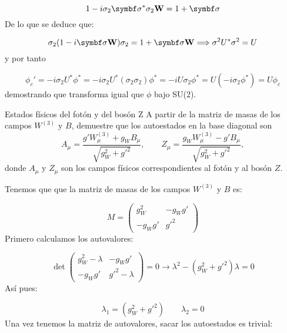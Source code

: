 \begin{equation}
	1 - i  \sigma_2 \sigman^* \sigma_2 \Wn = 1 + \sigman
\end{equation}
De lo que se deduce que:

\begin{equation}
	\sigma_2 (1- i \sigman \Wn ) \sigma_2 = 1 + \sigman \Wn \Longrightarrow \sigma^2 U^* \sigma^2 = U
\end{equation}
y por tanto

\begin{equation}
	\phi_c' =  - i \sigma_2 U^* \phi^* = - i \sigma_2 U^* (\sigma_2 \sigma_2) \phi^* = - i U \sigma_2 \phi^* = U (-i\sigma_2 \phi^*) = U \phi_c
\end{equation}
demostrando que transforma igual que $\phi$ bajo SU(2).

\begin{Ejercicio}{Estados físicos del fotón y del bosón Z}\label{Ej:16}
A partir de la matriz de masas de los campos $W^{(3)}$ y $B$, demuestre que los autoestados en la base diagonal son
\[
A_\mu = \frac{g' W_\mu^{(3)} + g_W B_\mu}{\sqrt{g_W^2 + g'^2}}, 
\qquad
Z_\mu = \frac{g_W W_\mu^{(3)} - g' B_\mu}{\sqrt{g_W^2 + g'^2}},
\]
donde $A_\mu$ y $Z_\mu$ son los campos físicos correspondientes al fotón y al bosón $Z$.
\end{Ejercicio}

Tenemos que que la matriz de masas de los campos $W^{(3)}$ y $B$ es: 

\begin{equation}
	M = 
	\begin{pmatrix}
		g_W^2 &  - g_W g' \\
		- g_W g' & g'^2 
	\end{pmatrix}
\end{equation}
Primero calculamos los autovalores: 

\begin{equation}
	\det 
	\begin{pmatrix}
		g_W^2 - \lambda &  - g_W g' \\
		- g_W g' & g'^2 - \lambda
	\end{pmatrix} = 0 \to \lambda^2 - (g_W^2 + g'^2) \lambda = 0 
\end{equation}
Así pues: 

\begin{equation}
	\lambda_1 = (g_W^2 + g'^2)  \qquad \lambda_2 = 0
\end{equation}
Una vez tenemos la matriz de autovalores, sacar los autoestados es trivial:

